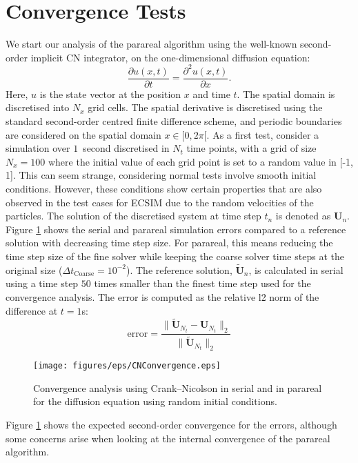 \section{Convergence Tests}
\label{sec: convergence}
We start our analysis of the parareal algorithm using the well-known second-order implicit CN integrator, on the one-dimensional diffusion equation:
\begin{equation}
    \frac{\partial u(x,t)}{\partial t} = \frac{\partial^2 u(x, t)}{\partial x}.
\end{equation}
Here, $u$ is the state vector at the position $x$ and time $t$. The spatial domain is discretised into $N_x$ grid cells. The spatial derivative is discretised using the standard second-order centred finite difference scheme, and periodic boundaries are considered on the spatial domain $x \in [0,2\pi[$. 
As a first test, consider a simulation over $1$\, second discretised in $N_t$ time points, with a grid of size $N_x = 100$ where the initial value of each grid point is set to a random value in [-1, 1]. This can seem strange, considering normal tests involve smooth initial conditions. However, these conditions show certain properties that are also observed in the test cases for ECSIM due to the random velocities of the particles. The solution of the discretised system at time step $t_n$ is denoted as $\textbf{U}_n$. 
Figure \ref{fig: CN-convergence-random} shows the serial and parareal simulation errors compared to a reference solution with decreasing time step size. For parareal, this means reducing the time step size of the fine solver while keeping the coarse solver time steps at the original size ($\Delta t_\mathrm{Coarse}= 10^{-2}$). The reference solution, $\tilde{\textbf{U}}_{n}$, is calculated in serial using a time step $50$ times smaller than the finest time step used for the convergence analysis. The error is computed as the relative l2 norm of the difference at $t=1$s:
\[\mathrm{error} = \frac{\|\tilde{\textbf{U}}_{N_t} - \textbf{U}_{N_t}\|_2}{\| \tilde{\textbf{U}}_{N_t} \|_2}\]
\begin{figure}[h]
    \centering
    \texttt{[image: figures/eps/CNConvergence.eps]}
    \caption{Convergence analysis using Crank--Nicolson in serial and in parareal for the diffusion equation using random initial conditions.}
    \label{fig: CN-convergence-random}
\end{figure}
Figure \ref{fig: CN-convergence-random} shows the expected second-order convergence for the errors, although some concerns arise when looking at the internal convergence of the parareal algorithm. 

